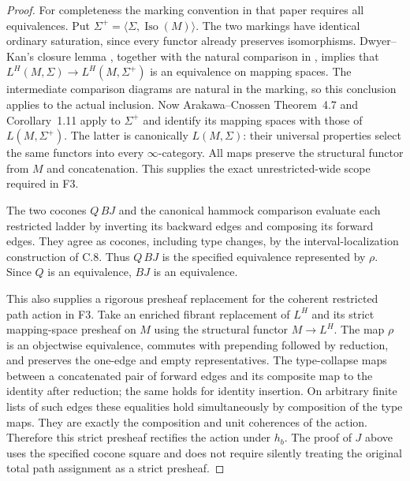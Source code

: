\begin{proof}
For completeness the marking convention in that paper requires
all equivalences. Put $\Sigma^+=\langle\Sigma,\operatorname{Iso}(M)\rangle$.
The two markings have identical ordinary saturation, since every
functor already preserves isomorphisms. Dwyer--Kan's closure lemma
\cite[Lemma~5.1]{CpathsDKSimplicial}, together with the natural
comparison in \cite[Proposition~2.2]{CpathsDKCalculating}, implies
that $L^H(M,\Sigma)\to L^H(M,\Sigma^+)$ is an equivalence on
mapping spaces. The intermediate comparison diagrams are natural
in the marking, so this conclusion applies to the actual inclusion.
Now Arakawa--Cnossen Theorem~4.7 and Corollary~1.11 apply to
$\Sigma^+$ and identify its mapping spaces with those of
$L(M,\Sigma^+)$. The latter is canonically $L(M,\Sigma)$:
their universal properties select the same functors into every
$\infty$-category. All maps preserve the structural functor from
$M$ and concatenation. This supplies the exact unrestricted-wide
scope required in F3.

The two cocones $Q\,BJ$ and the canonical hammock comparison
evaluate each restricted ladder by inverting its backward edges
and composing its forward edges. They agree as cocones, including
type changes, by the interval-localization construction of C.8.
Thus $Q\,BJ$ is the specified equivalence represented by $\rho$.
Since $Q$ is an equivalence, $BJ$ is an equivalence.

This also supplies a rigorous presheaf replacement for the
coherent restricted path action in F3. Take an enriched fibrant
replacement of $L^H$ and its strict mapping-space presheaf on $M$
using the structural functor $M\to L^H$. The map $\rho$ is an
objectwise equivalence, commutes with prepending followed by
reduction, and preserves the one-edge and empty representatives.
The type-collapse maps between a concatenated pair of forward
edges and its composite map to the identity after reduction;
the same holds for identity insertion. On arbitrary finite lists
of such edges these equalities hold simultaneously by composition
of the type maps. They are exactly the composition and unit
coherences of the action. Therefore this strict presheaf rectifies
the action under $h_b$. The proof of $J$ above uses the specified
cocone square and does not require silently treating the original
total path assignment as a strict presheaf.
\end{proof}

